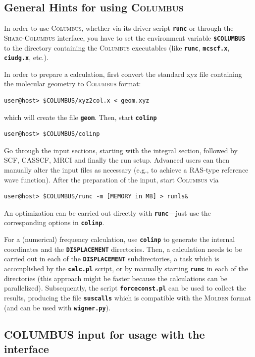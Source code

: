 \documentclass[a4paper,11pt,DIV=15,openany]{scrbook}
\newcommand{\sharc}{\textsc{Sharc}}
\newcommand{\ttt}[1]{\textbf{\texttt{#1}}}
\begin{document}
\subsection{General Hints for using \textsc{Columbus}}

In order to use \textsc{Columbus}, whether via its driver script \ttt{runc} or through the \sharc-\textsc{Columbus} interface, you have to set the environment variable \ttt{\$COLUMBUS} to the directory containing the \textsc{Columbus} executables (like \ttt{runc}, \ttt{mcscf.x}, \ttt{ciudg.x}, etc.).

In order to prepare a calculation, first convert the standard xyz file containing the molecular geometry to \textsc{Columbus} format:
\begin{verbatim}
user@host> $COLUMBUS/xyz2col.x < geom.xyz
\end{verbatim}
which will create the file \ttt{geom}. Then, start \ttt{colinp}
\begin{verbatim}
user@host> $COLUMBUS/colinp
\end{verbatim}

Go through the input sections, starting with the integral section, followed by SCF, CASSCF, MRCI and finally the run setup.
Advanced users can then manually alter the input files as necessary (e.g., to achieve a RAS-type reference wave function).
After the preparation of the input, start \textsc{Columbus} via
\begin{verbatim}
user@host> $COLUMBUS/runc -m [MEMORY in MB] > runls&
\end{verbatim}
An optimization can be carried out directly with \ttt{runc}---just use the corresponding options in \ttt{colinp}.

For a (numerical) frequency calculation, use \ttt{colinp} to generate the internal coordinates and the \ttt{DISPLACEMENT} directories. 
Then, a calculation needs to be carried out in each of the \ttt{DISPLACEMENT} subdirectories, a task which is accomplished by the \ttt{calc.pl} script, or by manually starting \ttt{runc} in each of the directories (this approach might be faster because the calculations can be parallelized). 
Subsequently, the script \ttt{forceconst.pl} can be used to collect the results, producing the file \ttt{suscalls} which is compatible with the \textsc{Molden} format (and can be used with \ttt{wigner.py}).

\subsection{COLUMBUS input for usage with the interface}
\end{document}
